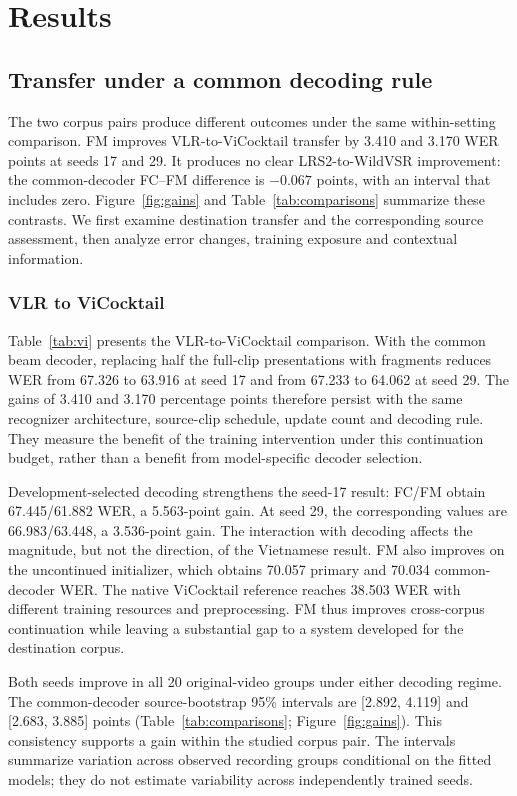 \section{Results}
\subsection{Transfer under a common decoding rule}
The two corpus pairs produce different outcomes under the same within-setting
comparison. FM improves VLR-to-ViCocktail transfer by 3.410 and 3.170 WER points
at seeds 17 and 29. It produces no clear LRS2-to-WildVSR improvement: the
common-decoder FC--FM difference is $-0.067$ points, with an interval that
includes zero. Figure~\ref{fig:gains} and Table~\ref{tab:comparisons} summarize
these contrasts. We first examine destination transfer and the corresponding
source assessment, then analyze error changes, training exposure and contextual
information.

\subsubsection{VLR to ViCocktail}

Table~\ref{tab:vi} presents the VLR-to-ViCocktail comparison. With the common
beam decoder, replacing half the full-clip presentations with fragments reduces
WER from 67.326 to 63.916 at seed 17 and from 67.233 to 64.062 at seed 29.
The gains of 3.410 and 3.170 percentage points therefore persist with the same
recognizer architecture, source-clip schedule, update count and decoding rule.
They measure the benefit of the training intervention under this continuation
budget, rather than a benefit from model-specific decoder selection.



Development-selected decoding strengthens the seed-17 result: FC/FM obtain
67.445/61.882 WER, a 5.563-point gain. At seed 29, the corresponding values are
66.983/63.448, a 3.536-point gain. The interaction with decoding affects the
magnitude, but not the direction, of the Vietnamese result. FM also improves on
the uncontinued initializer, which obtains 70.057 primary and 70.034 common-decoder
WER. The native ViCocktail reference reaches 38.503 WER with different training
resources and preprocessing. FM thus improves cross-corpus continuation while
leaving a substantial gap to a system developed for the destination corpus.

Both seeds improve in all 20 original-video groups under either decoding regime.
The common-decoder source-bootstrap 95\% intervals are [2.892, 4.119] and
[2.683, 3.885] points (Table~\ref{tab:comparisons}; Figure~\ref{fig:gains}).
This consistency supports a gain within the studied corpus pair. The intervals
summarize variation across observed recording groups conditional on the fitted
models; they do not estimate variability across independently trained seeds.

